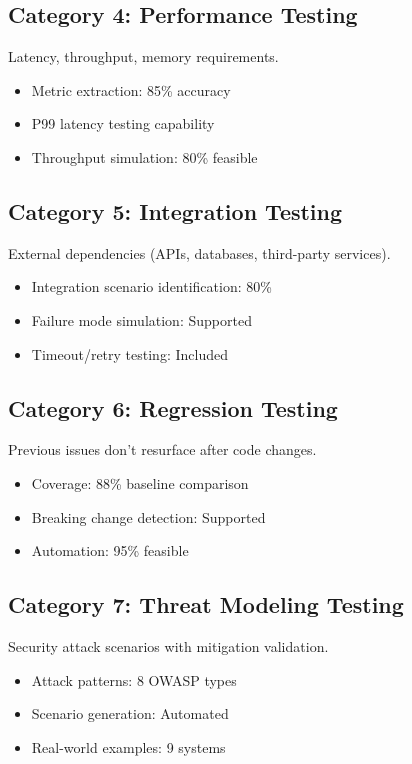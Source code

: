 \documentclass[12pt,oneside]{report}
\begin{document}
\subsection{Category 4: Performance Testing}
Latency, throughput, memory requirements.
\begin{itemize}
    \item Metric extraction: 85\% accuracy
    \item P99 latency testing capability
    \item Throughput simulation: 80\% feasible
\end{itemize}

\subsection{Category 5: Integration Testing}
External dependencies (APIs, databases, third-party services).
\begin{itemize}
    \item Integration scenario identification: 80\%
    \item Failure mode simulation: Supported
    \item Timeout/retry testing: Included
\end{itemize}

\subsection{Category 6: Regression Testing}
Previous issues don't resurface after code changes.
\begin{itemize}
    \item Coverage: 88\% baseline comparison
    \item Breaking change detection: Supported
    \item Automation: 95\% feasible
\end{itemize}

\subsection{Category 7: Threat Modeling Testing}
Security attack scenarios with mitigation validation.
\begin{itemize}
    \item Attack patterns: 8 OWASP types
    \item Scenario generation: Automated
    \item Real-world examples: 9 systems
\end{itemize}
\end{document}
